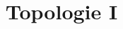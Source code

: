 \documentclass{skript}
\begin{document}
\title{Topologie I}
\author{}

\maketitle

\tableofcontents




\end{document}
